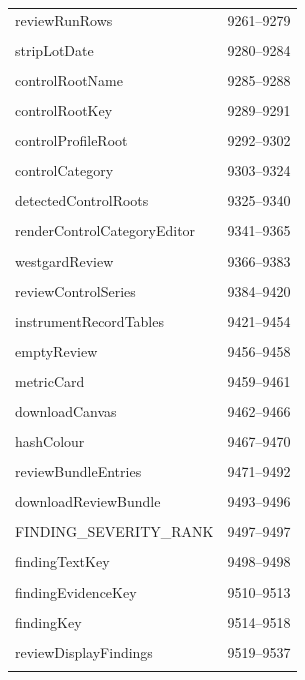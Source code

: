 {\begin{longtable}{@{}p{11cm}r@{}}
reviewRunRows & 9261--9279 \\\\\hline
stripLotDate & 9280--9284 \\\\\hline
controlRootName & 9285--9288 \\\\\hline
controlRootKey & 9289--9291 \\\\\hline
controlProfileRoot & 9292--9302 \\\\\hline
controlCategory & 9303--9324 \\\\\hline
detectedControlRoots & 9325--9340 \\\\\hline
renderControlCategoryEditor & 9341--9365 \\\\\hline
westgardReview & 9366--9383 \\\\\hline
reviewControlSeries & 9384--9420 \\\\\hline
instrumentRecordTables & 9421--9454 \\\\\hline
emptyReview & 9456--9458 \\\\\hline
metricCard & 9459--9461 \\\\\hline
downloadCanvas & 9462--9466 \\\\\hline
hashColour & 9467--9470 \\\\\hline
reviewBundleEntries & 9471--9492 \\\\\hline
downloadReviewBundle & 9493--9496 \\\\\hline
FINDING\_SEVERITY\_RANK & 9497--9497 \\\\\hline
findingTextKey & 9498--9498 \\\\\hline
findingEvidenceKey & 9510--9513 \\\\\hline
findingKey & 9514--9518 \\\\\hline
reviewDisplayFindings & 9519--9537 \\\\\hline

\end{longtable}}

